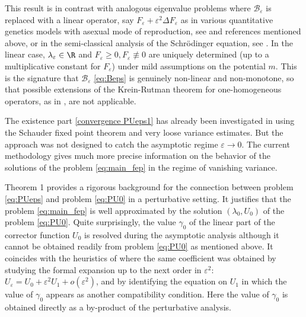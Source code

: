 \documentclass[JEP,XML,SOM,Unicode]{cedram}
\let\mathcal\mathscr
\newcommand{\cB}{\mathcal{B}}
\theoremstyle{plain}
\theoremstyle{definition}
\let\eps\varepsilon
\begin{document}
This result is in contrast with analogous eigenvalue problems where $\cB_\eps$ is replaced with a linear operator, say $F_\eps + \eps^2 \Delta F_\eps$ as in various quantitative genetics models with asexual mode of reproduction, see \eg \cite{mirrahimiconcentration} and references mentioned above, or in the semi-classical analysis of the Schrödinger equation, see \eg \cite{Sjostrand}. In the linear case, $\lambda_\eps\in \R$ and $F_\eps\geq 0, F_\eps\not\equiv 0$ are uniquely determined (up to a multiplicative constant for $F_\eps$) under mild assumptions on the potential $m$. This is the signature that $\cB_\eps$ \eqref{eq:Beps} is genuinely non-linear and non-monotone, so that possible extensions of the Krein-Rutman theorem for one-homogeneous operators, as in \cite{nonlinearkreinrutman}, are not applicable.

The existence part \eqref{convergence PUeps1} has already been investigated in \cite{bourgeronspec} using the Schauder fixed point theorem and very loose variance estimates. But the approach was not designed to catch the asymptotic regime $\eps\to 0$.
The current methodology gives much more precise information on the behavior of the solutions of the problem \eqref{eq:main_fep} in the regime of vanishing variance.

Theorem 1 provides a rigorous background for the connection between problem \eqref{eq:PUeps} and problem \eqref{eq:PU0} in a perturbative setting. It justifies that the problem \eqref{eq:main_fep} is well approximated by the solution $(\lambda_0,U_0)$ of the problem \eqref{eq:PU0}. Quite surprisingly, the value $\gamma_0$ of the linear part of the corrector function
$U_0$ is resolved during the asymptotic analysis although it cannot be obtained readily from problem \eqref{eq:PU0} as mentioned above. It coincides with the heuristics of \cite{main} where the same coefficient was obtained by studying the formal expansion up to the next order in $\eps^2$: $U_\eps = U_0 + \eps^2 U_1 + o(\eps^2)$, and by identifying the equation on $U_1$ in which the value of $\gamma_0$ appears as another compatibility condition. Here the value of $\gamma_0$ is obtained directly as a by-product of the perturbative analysis.
\end{document}
